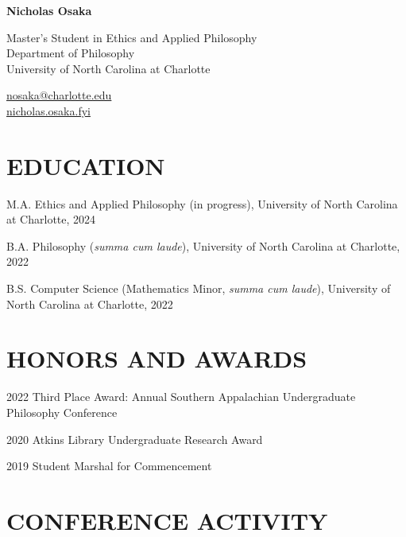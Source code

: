 \documentclass{article}
\begin{document}
\raggedright{}
\huge{\textbf{Nicholas Osaka}}
\normalsize

\vspace{1em}
\begin{minipage}[t]{0.700\textwidth}
    Master's Student in Ethics and Applied Philosophy\\
    Department of Philosophy \\
    University of North Carolina at Charlotte
\end{minipage}
\begin{minipage}[t]{0.275\textwidth}
    \flushright{}
    \href{mailto:nosaka@charlotte.edu}{nosaka@charlotte.edu} \\
    \href{https://nicholas.osaka.fyi}{nicholas.osaka.fyi}
\end{minipage}

\section*{\normalsize{\MakeUppercase{Education}}}
\begin{tablist}
    \item[M.A.]  \tab{}Ethics and Applied Philosophy (in progress), University of North Carolina at Charlotte, 2024
    \item[B.A.]  \tab{}Philosophy (\textit{summa cum laude}), University of North Carolina at Charlotte, 2022
    \item[B.S.]  \tab{}Computer Science (Mathematics Minor, \textit{summa cum laude}), University of North Carolina at Charlotte, 2022
\end{tablist}

\section*{\normalsize{\MakeUppercase{Honors and Awards}}}
\begin{tablist}
    \item[2022] \tab{}Third Place Award:  Annual Southern Appalachian Undergraduate Philosophy Conference
    \item[2020] \tab{}Atkins Library Undergraduate Research Award
    \item[2019] \tab{}Student Marshal for Commencement
\end{tablist}

\section*{\normalsize{\MakeUppercase{Conference Activity}}}
\end{document}
